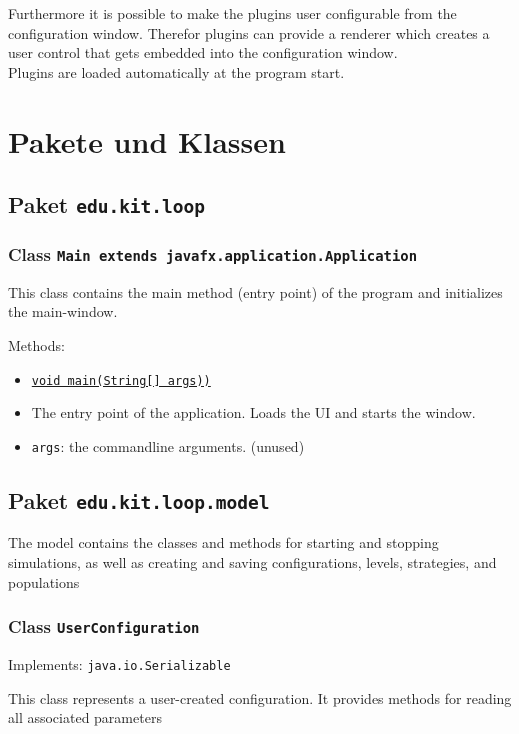 \documentclass[parskip=full,11pt]{scrartcl}
\begin{document}
Furthermore it is possible to make the plugins user configurable from the configuration window. Therefor plugins can provide a renderer which creates a user control that gets embedded into the configuration window.\\
Plugins are loaded automatically at the program start.

\section{Pakete und Klassen}

\subsection{Paket \texttt{edu.kit.loop}}

\subsubsection{Class \texttt{Main extends javafx.application.Application}}

This class contains the main method (entry point) of the program and initializes the main-window.

Methods:
\begin{itemize}\itemsep -10pt
\item \underline{\texttt{void main(String[] args))}}
\item[] The entry point of the application. Loads the UI and starts the window.
\item[] \texttt{args}: the commandline arguments. (unused)
\end{itemize}

\subsection{Paket \texttt{edu.kit.loop.model}}
The model contains the classes and methods for starting and stopping simulations, as well as creating and saving configurations, levels, strategies, and populations

\subsubsection{Class \texttt{UserConfiguration}}
Implements: \texttt{java.io.Serializable}

This class represents a user-created configuration. It provides methods for reading all associated parameters
\end{document}
